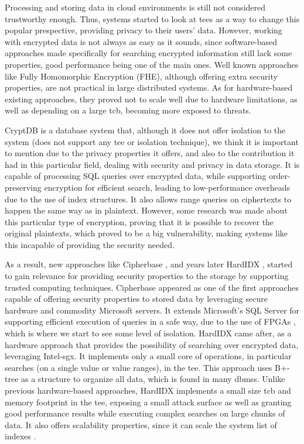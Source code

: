 Processing and storing data in cloud environments is still not considered trustworthy enough. Thus, systems started to look at \gls{tee}s as a way to change this popular prespective, providing privacy to their users' data. 
However, working with encrypted data is not always as easy as it sounds, since software-based approaches made specifically for searching encrypted information still lack some properties, good performance being one of the main ones. Well known approaches like Fully Homomorphic Encryption (FHE), although offering extra security properties, are not practical in large distributed systems. As for hardware-based existing approaches, they proved not to scale well due to hardware limitations, as well as depending on a large \gls{tcb}, becoming more exposed to threats.

CryptDB \cite{cryptDBPaper} is a database system that, although it does not offer isolation to the system (does not support any \gls{tee} or isolation technique), we think it is important to mention due to the privacy properties it offers, and also to the contribution it had in this particular field, dealing with security and privacy in data storage.
It is capable of processing SQL queries over encrypted data, while supporting order-preserving encryption for efficient search, leading to low-performance overheads due to the use of index structures. It also allows range queries on ciphertexts to happen the same way as in plaintext. However, some research  \cite{naveedPaper} was made about this particular type of encryption, proving that it is possible to recover the original plaintexts, which proved to be a big vulnerability, making systems like this incapable of providing the security needed.

As a result, new approaches like Cipherbase \cite{cipherbasePaper}, and years later HardIDX \cite{hardIDXPaper}, started to gain relevance for providing security properties to the storage by supporting trusted computing techniques.
Cipherbase appeared as one of the first approaches capable of offering security properties to stored data by leveraging secure hardware and commodity Microsoft servers. It extends Microsoft's SQL Server for supporting efficient execution of queries in a safe way, due to the use of FPGAs \cite{fpga}, which is where we start to see some level of isolation.
HardIDX came after, as a hardware approach that provides the possibility of searching over encrypted data, leveraging Intel-\gls{sgx}. It implements only a small core of operations, in particular searches (on a single value or value ranges), in the \gls{tee}.
This approach uses B+-tree as a structure to organize all data, which is found in many \gls{dbms}s.
Unlike previous hardware-based approaches, HardIDX implements a small size \gls{tcb} and memory footprint in the \gls{tee}, exposing a small attack surface as well as granting good performance results while executing complex searches on large chunks of data. It also offers scalability properties, since it can scale the system list of indexes \cite{hardIDXPaper}.\newline

